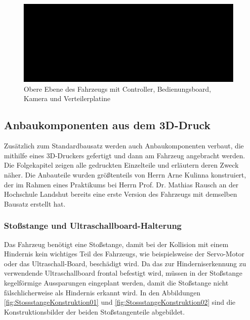 \begin{figure}[H] %
\includegraphics[width=.75\textwidth]{sec2/images/Grundaufbau/ObereEbene02} 
\centering
\captionsetup{width=.95\textwidth}
\caption[Obere Ebene des Fahrzeugs]{Obere Ebene des Fahrzeugs mit Controller, Bedienungsboard, Kamera und Verteilerplatine}\centering
\label{fig:ObereEbene02}
\end{figure}

\newpage

\subsection{Anbaukomponenten aus dem 3D-Druck}\label{Sec2Sub2}

Zusätzlich zum Standardbausatz werden auch Anbaukomponenten verbaut, die mithilfe eines 3D-Druckers gefertigt und dann am Fahrzeug angebracht werden. Die Folgekapitel zeigen alle gedruckten Einzelteile und erläutern deren Zweck näher. Die Anbauteile wurden größtenteils von Herrn Arne Kulinna konstruiert, der im Rahmen eines Praktikums bei Herrn Prof. Dr. Mathias Rausch an der Hochschule Landshut bereits eine erste Version des Fahrzeugs mit demselben Bausatz erstellt hat.

\subsubsection{Stoßstange und Ultraschallboard-Halterung}\label{Sec2Sub2SubSub1}

Das Fahrzeug benötigt eine Stoßstange, damit bei der Kollision mit einem Hindernis kein wichtiges Teil des Fahrzeugs, wie beispielsweise der Servo-Motor oder das Ultraschall-Board, beschädigt wird. Da das zur Hinderniserkennung zu verwendende Ultraschallboard frontal befestigt wird, müssen in der Stoßstange kegelförmige Aussparungen eingeplant werden, damit die Stoßstange nicht fälschlicherweise als Hindernis erkannt wird. In den Abbildungen \ref{fig:StossstangeKonstruktion01} und \ref{fig:StossstangeKonstruktion02} sind die Konstruktionsbilder der beiden Stoßstangenteile abgebildet.

